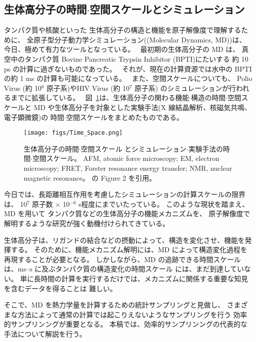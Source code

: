 
\subsection{生体高分子の時間$\cdot$空間スケールとシミュレーション}
\label{subsec:timespaceMD}

タンパク質や核酸といった
生体高分子の構造と機能を原子解像度で理解するために、
全原子型分子動力学シミュレーション((Molecular Dynamics, MD))は、
今日、極めて有力なツールとなっている。~\cite{Dror2012,Tukerman2000}
最初期の生体高分子の MD は、
真空中のタンパク質 Bovine Pancreatic Trypsin Inhibitor (BPTI)にたいする
約 10  ps の計算に過ぎないものであった。~\cite{MacCamon1976}
それが、現在の計算資源では水中の BPTI の約 1 ms の計算も可能になっている。~\cite{Shaw2009}
また、空間スケールについても、
Polio Virus (約 10$^{6}$ 原子系)やHIV Virus (約 10$^{7}$ 原子系)
のシミュレーションが行われるまでに拡張している。~\cite{Modylas2013,NAMD2013}
図~\ref{fig:timespacescale}は、生体高分子の関わる機能$\cdot$構造の時間$\cdot$空間スケールと
MD や生体高分子を対象とした実験手法(X 線結晶解析、核磁気共鳴、電子顕微鏡)の
時間$\cdot$空間スケールをまとめたものである。
\begin{figure}[h]
  \centering
  \texttt{[image: figs/Time\_Space.png]}
  \caption{生体高分子の時間$\cdot$空間スケール
    とシミュレーション$\cdot$実験手法の時間$\cdot$空間スケール。
    AFM, atomic force microscopy; EM, electron microscopy;
    FRET, Forster resonance energy transfer; NMR, nuclear magnetic resonance。
    \cite{Dror2012} の Figure 2 を引用。}
  \label{fig:timespacescale}
\end{figure}
今日では、長距離相互作用を考慮したシミュレーションの計算スケールの限界は、
10$^{7}$ 原子数 $\times$ 10$^{-6}$ s程度にまでいたっている。
このような現状を踏まえ、MD を用いて
タンパク質などの生体高分子の機能メカニズムを、
原子解像度で解明するような研究が強く動機付けられてきている。

生体高分子は、リガンドの結合などの摂動によって、構造を変化させ、機能を発揮する。
そのために、機能メカニズム解明には、MD によって構造変化過程を再現することが必要となる。
しかしながら、MD の追跡できる時間スケールは、ms--s に及ぶタンパク質の構造変化の時間スケール
には、まだ到達していない。
単に長時間の計算を実行するだけでは、メカニズムに関係する重要な知見を含むデータを得ることは
難しい。

そこで、MD を熱力学量を計算するための統計サンプリングと見做し、
さまざまな方法によって通常の計算では起こりえないようなサンプリングを行う
効率的サンプリンングが重要となる。
本稿では、効率的サンプリンングの代表的な手法について解説を行う。

